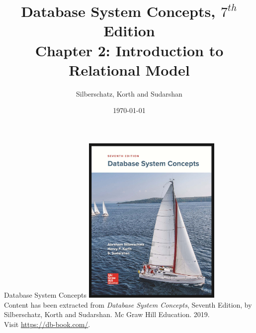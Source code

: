 \documentclass{beamer}
\title[Chapter 2]{Database System Concepts, $7^{th}$ Edition \\ Chapter 2: Introduction to Relational Model}
\author{Silberschatz, Korth and Sudarshan}
\date{\today}
\begin{document}
\frame{\titlepage}

\begin{frame}{Database System Concepts}
    \centering
    \includegraphics[width=0.5\textwidth]{figures/book_cover.jpg} \\
    \vspace{5mm}
    {
        \tiny
        Content has been extracted from \textit{Database System Concepts}, Seventh Edition, by Silberschatz, Korth and Sudarshan. Mc Graw Hill Education. 2019.\\
        Visit \url{https://db-book.com/}.\\
    }
\end{frame}
\end{document}
